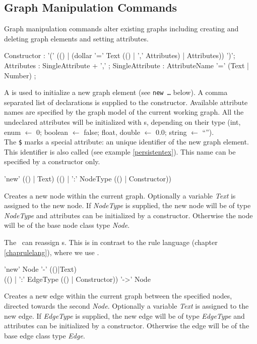 \subsection{Graph Manipulation Commands}
\label{mani}
Graph manipulation commands alter existing graphs including creating and deleting graph elements and setting attributes.

\begin{rail}
  Constructor : '(' (() | (dollar '=' Text (() | ',' Attributes) | Attributes)) ')';
  Attributes : SingleAttribute + ',' ;
  SingleAttribute : AttributeName '=' (Text | Number) ; 
\end{rail}\indexmain{\texttt{\$}}
A  is used to initialize a new graph element (see \texttt{new \dots} below). A comma separated list of  declarations is supplied to the constructor. Available attribute names are specified by the graph model of the current working graph. All the undeclared attributes will be initialized with s, depending on their type (int, enum $\leftarrow$ 0; boolean $\leftarrow$ false; float, double $\leftarrow$ 0.0; string $\leftarrow$ ``'').\\
The \texttt{\$} marks a special attribute: an unique identifier of the new graph element. This identifier is also called  (see example \ref{persistentex}). This name can be specified by a constructor only.

\begin{rail}
  'new' (() | Text) (() | ':' NodeType (() | Constructor))
\end{rail}
Creates a new node within the current graph. Optionally a variable \emph{Text} is assigned to the new node. If \emph{NodeType} is supplied, the new node will be of type \emph{NodeType} and attributes can be initialized by a constructor. Otherwise the node will be of the base node class type \emph{Node}.
\begin{note}
The \GrShell\ can reassign s. 
This is in contrast to the rule language (chapter \ref{chaprulelang}), where we use \emph{}.
\end{note}

\begin{rail}
  'new' Node '-' (()|Text) \\ (() | ':' EdgeType (() | Constructor)) '->' Node
\end{rail}
Creates a new edge within the current graph between the specified nodes, directed towards the second \emph{Node}. Optionally a variable \emph{Text} is assigned to the new edge. If \emph{EdgeType} is supplied, the new edge will be of type \emph{EdgeType} and attributes can be initialized by a constructor. Otherwise the edge will be of the base edge class type \emph{Edge}.

